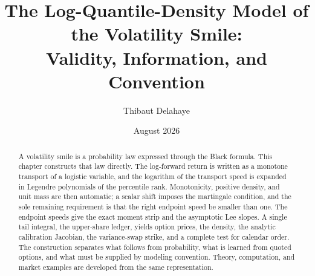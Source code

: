 \documentclass[11pt,a4paper]{article}
\title{\textbf{The Log-Quantile-Density Model of the Volatility Smile:\\
Validity, Information, and Convention}}
\author{Thibaut Delahaye}
\date{August 2026}
\theoremstyle{plain}
\theoremstyle{definition}
\theoremstyle{remark}
\newcommand{\1}{\mathbf{1}}
\begin{document}
\maketitle

\begin{abstract}
A volatility smile is a probability law expressed through the Black formula.
This chapter constructs that law directly.  The log-forward return is written
as a monotone transport of a logistic variable, and the logarithm of the
transport speed is expanded in Legendre polynomials of the percentile rank.
Monotonicity, positive density, and unit mass are then automatic; a scalar
shift imposes the martingale condition, and the sole remaining requirement is
that the right endpoint speed be smaller than one.  The endpoint speeds give
the exact moment strip and the asymptotic Lee slopes.  A single tail integral,
the upper-share ledger, yields option prices, the density, the analytic
calibration Jacobian, the variance-swap strike, and a complete test for
calendar order.  The construction separates what follows from probability,
what is learned from quoted options, and what must be supplied by modeling
convention.  Theory, computation, and market examples are developed from the
same representation.
\end{abstract}

\tableofcontents
\newpage











\appendix






\end{document}
